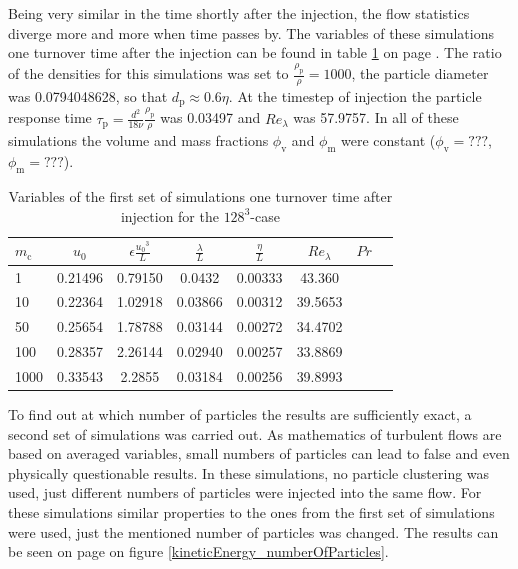 \documentclass[11pt,a4paper,openany,oneside,parskip=half*]{article}
\begin{document}
Being very similar in the time shortly after the injection, the flow statistics diverge more and more when time passes by. The variables of these simulations one turnover time after the injection can be found in table \ref{table_properties} on page \pageref{table_properties}. The ratio of the densities for this simulations was set to $\frac{\rho_\mathrm{p}}{\rho} = 1000$, the particle diameter was 0.0794048628, so that $d_\mathrm{p} \approx 0.6 \eta$. At the timestep of injection the particle response time $\tau_\mathrm{p}=\frac{d^2}{18 \nu} \frac{\rho_\mathrm{p}}{\rho}$ was 0.03497 and $Re_\lambda$ was 57.9757. In all of these simulations the volume and mass fractions $\phi_\mathrm{v}$ and $\phi_\mathrm{m}$ were constant ($\phi_\mathrm{v}= ???$, $\phi_\mathrm{m}=???$).
\begin{table}[h]
\begin{center}
\begin{tabular}{l | c c c c c c c }
$m_\mathrm{c}$ & $u_0$ & $\epsilon \frac{{u_0}^3}{L}$ & $\frac{\lambda}{L}$ & $\frac{\eta}{L} $ & $Re_\lambda$ & $Pr$ \\
\hline
\hline
1 & 0.21496 & 0.79150 & 0.0432 & 0.00333 & 43.360 &\\
10 & 0.22364 & 1.02918 & 0.03866 & 0.00312 & 39.5653 &\\
50 & 0.25654 & 1.78788 & 0.03144 & 0.00272 & 34.4702 &\\
100 & 0.28357 & 2.26144 & 0.02940 & 0.00257 & 33.8869 &\\
1000 & 0.33543 & 2.2855 & 0.03184 & 0.00256 & 39.8993 &\\
\hline
\end{tabular}
\caption{Variables of the first set of simulations one turnover time after injection for the $128^3$-case}
\label{table_properties}
\end{center}
\end{table}
\newline
To find out at which number of particles the results are sufficiently exact, a second set of simulations was carried out. As mathematics of turbulent flows are based on averaged variables, small numbers of particles can lead to false and even physically questionable results. In these simulations, no particle clustering was used, just different numbers of particles were injected into the same flow. For these simulations similar properties to the ones from the first set of simulations were used, just the mentioned number of particles was changed. The results can be seen on page \pageref{kineticEnergy_numberOfParticles} on figure \ref{kineticEnergy_numberOfParticles}. 
\end{document}

